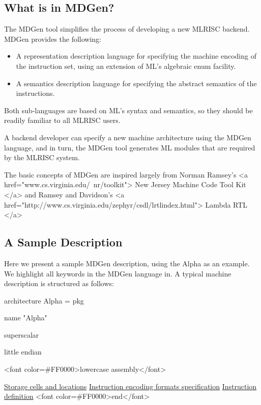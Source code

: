 \subsection{ What is in MDGen? }
The MDGen tool simplifies the process of developing a new MLRISC backend.  
MDGen provides the following:
\begin{itemize}
   \item A representation description language for specifying the
     machine encoding of the instruction set,
     using an extension of ML's algebraic enum facility.
   \item A semantics description language for specifying the abstract semantics
      of the instructions.
\end{itemize}

Both sub-languages are based on ML's syntax and semantics, so
they should be readily familiar to all MLRISC users.

A backend developer can specify a new machine architecture using the MDGen 
language, and in turn, the MDGen tool generates ML modules that are
required by the MLRISC system.

The basic concepts of MDGen are inspired largely from 
Norman Ramsey's <a href="www.cs.virginia.edu/~nr/toolkit">
New Jersey Machine Code Tool Kit </a> and 
Ramsey and Davidson's
<a href="http://www.cs.virginia.edu/zephyr/csdl/lrtlindex.html">
Lambda RTL </a>

\subsection{A Sample Description}

Here we present a sample MDGen description, using the Alpha as an example.
We highlight all keywords in the MDGen language 
in.  A typical machine description
is structured as follows:

\begin{SML}
architecture Alpha =
   pkg

   name "Alpha"

   superscalar

   little endian

   <font color=#FF0000>lowercase assembly</font>

   \href{#cells}{Storage cells and locations}
   \href{#encoding}{Instruction encoding formats specification}
   \href{#instruction}{Instruction definition}
<font color=#FF0000>end</font>
\end{SML}

